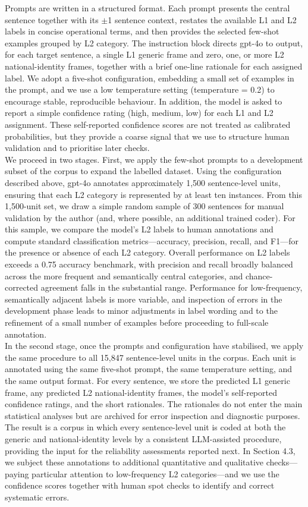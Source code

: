 \documentclass[man,12pt]{apa7}
\begin{document}
Prompts are written in a structured format. 
Each prompt presents the central sentence together with its $\pm$1 sentence context, restates the available L1 and L2 labels in concise operational terms, and then provides the selected few-shot examples grouped by L2 category. 
The instruction block directs gpt-4o to output, for each target sentence, a single L1 generic frame and zero, one, or more L2 national-identity frames, together with a brief one-line rationale for each assigned label. 
We adopt a five-shot configuration, embedding a small set of examples in the prompt, and we use a low temperature setting (temperature = 0.2) to encourage stable, reproducible behaviour. 
In addition, the model is asked to report a simple confidence rating (high, medium, low) for each L1 and L2 assignment. 
These self-reported confidence scores are not treated as calibrated probabilities, but they provide a coarse signal that we use to structure human validation and to prioritise later checks.\\%
We proceed in two stages. 
First, we apply the few-shot prompts to a development subset of the corpus to expand the labelled dataset. 
Using the configuration described above, gpt-4o annotates approximately 1,500 sentence-level units, ensuring that each L2 category is represented by at least ten instances. 
From this 1,500-unit set, we draw a simple random sample of 300 sentences for manual validation by the author (and, where possible, an additional trained coder). 
For this sample, we compare the model's L2 labels to human annotations and compute standard classification metrics---accuracy, precision, recall, and F1---for the presence or absence of each L2 category. 
Overall performance on L2 labels exceeds a 0.75 accuracy benchmark, with precision and recall broadly balanced across the more frequent and semantically central categories, and chance-corrected agreement falls in the substantial range. 
Performance for low-frequency, semantically adjacent labels is more variable, and inspection of errors in the development phase leads to minor adjustments in label wording and to the refinement of a small number of examples before proceeding to full-scale annotation.\\%
In the second stage, once the prompts and configuration have stabilised, we apply the same procedure to all 15,847 sentence-level units in the corpus. 
Each unit is annotated using the same five-shot prompt, the same temperature setting, and the same output format. 
For every sentence, we store the predicted L1 generic frame, any predicted L2 national-identity frames, the model's self-reported confidence ratings, and the short rationales. 
The rationales do not enter the main statistical analyses but are archived for error inspection and diagnostic purposes. 
The result is a corpus in which every sentence-level unit is coded at both the generic and national-identity levels by a consistent LLM-assisted procedure, providing the input for the reliability assessments reported next. 
In Section 4.3, we subject these annotations to additional quantitative and qualitative checks---paying particular attention to low-frequency L2 categories---and we use the confidence scores together with human spot checks to identify and correct systematic errors.\\%
\end{document}
